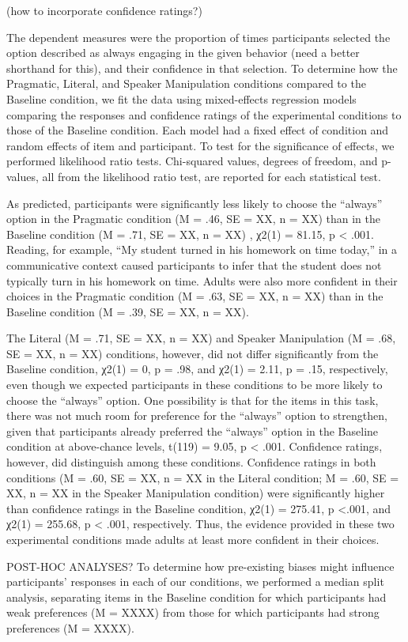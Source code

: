 \documentclass[10pt,letterpaper]{article}
\begin{document}
(how to incorporate confidence ratings?)

The dependent measures were the proportion of times participants selected the option described as always engaging in the given behavior (need a better shorthand for this), and their confidence in that selection.  To determine how the Pragmatic, Literal, and Speaker Manipulation conditions compared to the Baseline condition, we fit the data using mixed-effects regression models comparing the responses and confidence ratings of the experimental conditions to those of the Baseline condition.  Each model had a fixed effect of condition and random effects of item and participant.  To test for the significance of effects, we performed likelihood ratio tests. Chi-squared values, degrees of freedom, and p-values, all from the likelihood ratio test, are reported for each statistical test.

As predicted, participants were significantly less likely to choose the “always” option in the Pragmatic condition (M = .46, SE = XX, n = XX) than in the Baseline condition (M = .71, SE = XX, n = XX) , χ2(1) = 81.15, p < .001.  Reading, for example, “My student turned in his homework on time today,” in a communicative context caused participants to infer that the student does not typically turn in his homework on time.  Adults were also more confident in their choices in the Pragmatic condition (M = .63, SE = XX, n = XX) than in the Baseline condition (M = .39, SE = XX, n = XX).

The Literal (M = .71, SE = XX, n = XX) and Speaker Manipulation (M = .68,  SE = XX, n = XX) conditions, however, did not differ significantly from the Baseline condition, χ2(1) = 0, p = .98, and χ2(1) = 2.11, p = .15, respectively, even though we expected participants in these conditions to be more likely to choose the “always” option.  One possibility is that for the items in this task, there was not much room for preference for the “always” option to strengthen, given that participants already preferred the “always” option in the Baseline condition at above-chance levels, t(119) = 9.05, p < .001.  Confidence ratings, however, did distinguish among these conditions.  Confidence ratings in both conditions (M = .60, SE = XX, n = XX in the Literal condition; M = .60, SE = XX, n = XX in the Speaker Manipulation condition) were significantly higher than confidence ratings in the Baseline condition,  χ2(1) = 275.41, p <.001, and χ2(1) = 255.68, p < .001, respectively.  Thus, the evidence provided in these two experimental conditions made adults at least more confident in their choices.  

POST-HOC ANALYSES?
To determine how pre-existing biases might influence participants’ responses in each of our conditions, we performed a median split analysis, separating items in the Baseline condition for which participants had weak preferences (M  = XXXX) from those for which participants had strong preferences (M = XXXX).  




\setlength{\bibleftmargin}{.125in}
\setlength{\bibindent}{-\bibleftmargin}


\end{document}
